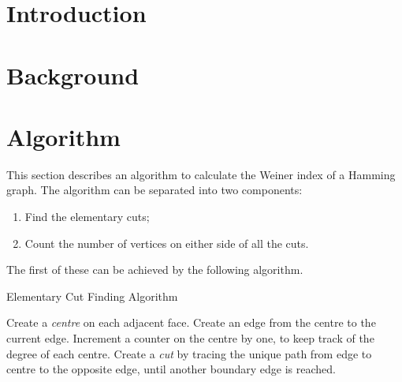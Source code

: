 \documentclass[a4paper]{article}
\begin{document}
\section{Introduction}

\section{Background}

\section{Algorithm}
This section describes an algorithm to calculate the Weiner index of a Hamming graph. The algorithm can be separated into two components:
\begin{enumerate}
\item Find the elementary cuts;
\item Count the number of vertices on either side of all the cuts.
\end{enumerate}

The first of these can be achieved by the following algorithm.

\begin{algorithm}
  \caption{Elementary Cut Finding Algorithm}\label{euclid}
  \begin{algorithmic}[1]
      	\State Create a \emph{centre} on each adjacent face.
      	\State Create an edge from the centre to the current edge.
      	\State Increment a counter on the centre by one, to keep track of the degree of each centre.
      \EndFor
      	\State Create a \emph{cut} by tracing the unique path from edge to centre to the opposite edge, until another boundary edge is reached.
      \EndFor
  \end{algorithmic}
\end{algorithm}
\end{document}
